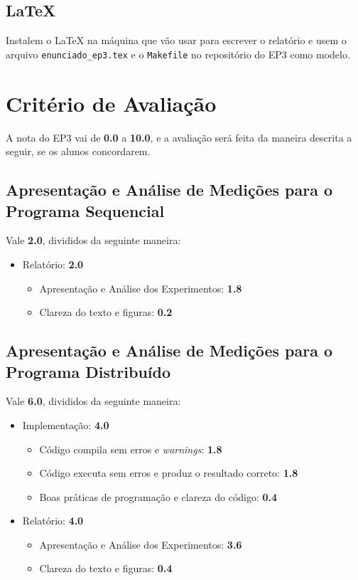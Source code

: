 \documentclass[final,12pt,a4paper]{elsarticle}
\begin{document}
\subsection{\LaTeX}

Instalem o \LaTeX{} na máquina que vão usar para escrever o relatório e usem o
arquivo \texttt{enunciado\_ep3.tex} e o \texttt{Makefile} no repositório do EP3
como modelo.

\section{Critério de Avaliação}

A nota do EP3 vai de \textbf{0.0} a \textbf{10.0}, e a avaliação será feita da
maneira descrita a seguir, se os alunos concordarem.

\subsection{Apresentação e Análise de Medições para o Programa Sequencial}

Vale \textbf{2.0}, divididos da seguinte maneira:

\begin{itemize}
    \item Relatório: \textbf{2.0}
    \begin{itemize}
        \item Apresentação e Análise dos Experimentos: \textbf{1.8}
        \item Clareza do texto e figuras: \textbf{0.2}
    \end{itemize}
\end{itemize}

\subsection{Apresentação e Análise de Medições para o Programa Distribuído}

Vale \textbf{6.0}, divididos da seguinte maneira:

\begin{itemize}
    \item Implementação: \textbf{4.0}
    \begin{itemize}
        \item Código compila sem erros e \textit{warnings}: \textbf{1.8}
        \item Código executa sem erros e produz o resultado correto: \textbf{1.8}
        \item Boas práticas de programação e clareza do código: \textbf{0.4}
    \end{itemize}
    \item Relatório: \textbf{4.0}
    \begin{itemize}
        \item Apresentação e Análise dos Experimentos: \textbf{3.6}
        \item Clareza do texto e figuras: \textbf{0.4}
    \end{itemize}
\end{itemize}
\end{document}
